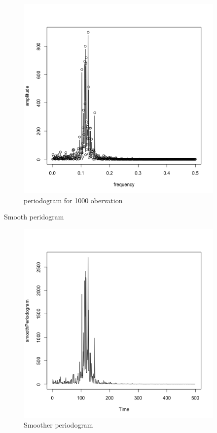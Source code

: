 \documentclass[11pt, oneside]{article}   	%
\begin{document}
\begin{figure}[H] %
   \centering
   \includegraphics[width=4in]{../code/periodogram1000} 
   \caption{periodogram for 1000 obervation}
   \label{fig:periodogram1000}
\end{figure}
Smooth peridogram
\begin{figure}[H] %
   \centering
   \includegraphics[width=4in]{../code/smoothPeriodogram1000.png} 
   \caption{Smoother periodogram}
   \label{fig:smoothp}
\end{figure}
\end{document}
